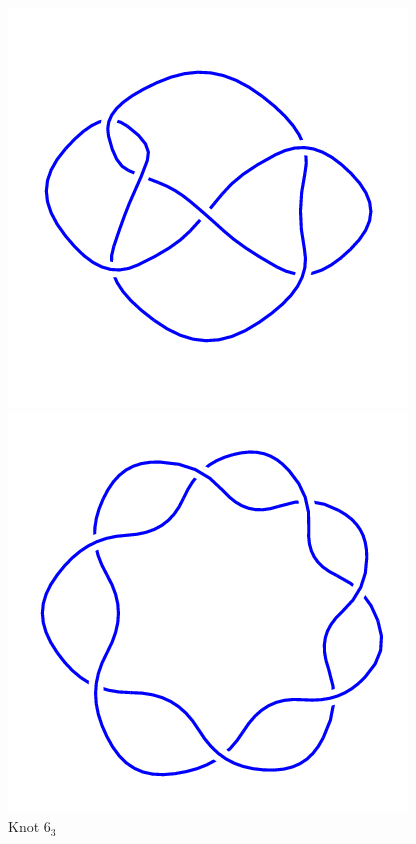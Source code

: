 \documentclass{article}
\begin{document}
\begin{figure}[!htb]
\includegraphics[width=\linewidth]{6_3.png}
\caption{Knot $6_3$}
\endminipage\hfill
{}
\includegraphics[width=\linewidth]{7_1.png}

\end{figure}
\end{document}
